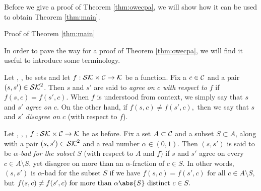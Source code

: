 \begin{remark}
\end{remark}

Before we give a proof of Theorem \ref{thm:owecpa},
we will show how it can be used to obtain Theorem \ref{thm:main}.

\begin{namedproof}{Proof of Theorem \ref{thm:main}}
\end{namedproof}

In order to pave the way for a proof of Theorem \ref{thm:owecpa},
we will find it useful to introduce some terminology.

\begin{definition}\label{def:agree}
  Let \setSK, \setC, \keyspace be sets and
  let \(f : \mathcal{SK} \times \mathcal{C} \to \mathcal{K}\) be a function.
  Fix a \(c \in \mathcal{C}\) and a pair \((s,s') \in \mathcal{SK}^{2}\).
  Then \(s\) and \(s'\) are said to \emph{agree on \(c\) with respect to \(f\)} if
  \(
    f(s,c) = f(s',c).
  \)
  When \(f\) is understood from context, we simply say that \(s\) and \(s'\) \emph{agree on \(c\)}.
  On the other hand, if
  \(
    f(s,c) \ne f(s',c),
  \)
  then we say that \(s\) and \(s'\) \emph{disagree on \(c\)} (with respect to \(f\)).
\end{definition}


\begin{definition}\label{def:bad}
  Let \setSK, \setC, \keyspace, \(f : \mathcal{SK} \times \mathcal{C} \to \mathcal{K}\) be as before.
  Fix a set \(A \subset \mathcal{C}\) and a subset \(S \subset A\),
  along with a pair \((s,s') \in \mathcal{SK}^{2}\) and a real number \(\alpha \in (0,1)\).
  Then \((s,s')\) is said to be \emph{\(\alpha\)-bad for the subset \(S\)} (with respect to \(A\) and \(f\)) if
  \(s\) and \(s'\) agree on every \(c \in A \setminus S\), yet disagree on more than an \(\alpha\)-fraction of \(c \in S\).
  In other words, \((s,s')\) is \(\alpha\)-bad for the subset \(S\) if we have
  \(
    f(s,c) = f(s',c) \text{ for all } c \in A \setminus S,
  \)
  but
  \(
    f(s,c) \ne f(s',c) \text{ for more than } \alpha \abs{S} \text{ distinct } c \in S.
  \)
\end{definition}

